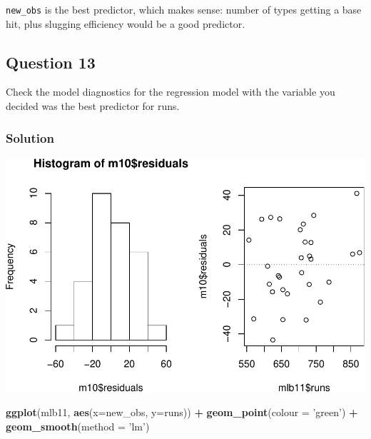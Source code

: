 \documentclass[]{article}
\newenvironment{Shaded}{\begin{snugshade}}{\end{snugshade}}
\newcommand{\KeywordTok}[1]{\textcolor[rgb]{0.13,0.29,0.53}{\textbf{#1}}}
\newcommand{\DataTypeTok}[1]{\textcolor[rgb]{0.13,0.29,0.53}{#1}}
\newcommand{\DecValTok}[1]{\textcolor[rgb]{0.00,0.00,0.81}{#1}}
\newcommand{\StringTok}[1]{\textcolor[rgb]{0.31,0.60,0.02}{#1}}
\newcommand{\OperatorTok}[1]{\textcolor[rgb]{0.81,0.36,0.00}{\textbf{#1}}}
\newcommand{\NormalTok}[1]{#1}
\begin{document}
\texttt{new\_obs} is the best predictor, which makes sense: number of
types getting a base hit, plus slugging efficiency would be a good
predictor.

\subsection{Question 13}\label{question-13}

Check the model diagnostics for the regression model with the variable
you decided was the best predictor for runs.

\subsubsection{Solution}\label{solution-12}

\begin{Shaded}
\end{Shaded}

\includegraphics{DATA_606_Lab_7_files/figure-latex/unnamed-chunk-4-1.pdf}

\begin{Shaded}
\begin{Highlighting}[]
\KeywordTok{ggplot}\NormalTok{(mlb11, }\KeywordTok{aes}\NormalTok{(}\DataTypeTok{x=}\NormalTok{new_obs, }\DataTypeTok{y=}\NormalTok{runs)) }\OperatorTok{+}
\StringTok{  }\KeywordTok{geom_point}\NormalTok{(}\DataTypeTok{colour =} \StringTok{'green'}\NormalTok{) }\OperatorTok{+}
\StringTok{  }\KeywordTok{geom_smooth}\NormalTok{(}\DataTypeTok{method =} \StringTok{'lm'}\NormalTok{)}
\end{Highlighting}
\end{Shaded}
\end{document}
